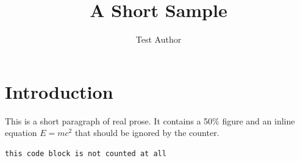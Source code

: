 \documentclass[12pt]{article}
\title{A Short Sample}
\author{Test Author}
\begin{document}
\maketitle

\section{Introduction}
This is a short paragraph of real prose. It contains a 50\% figure and an
inline equation $E = mc^2$ that should be ignored by the counter. %

\begin{verbatim}
this code block is not counted at all
\end{verbatim}
\end{document}
